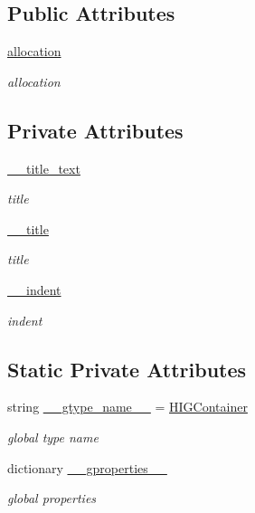 \subsection*{Public Attributes}
\begin{DoxyCompactItemize}
\item 
\hyperlink{classvisualizer_1_1higcontainer_1_1HIGContainer_af0d4a951cf5815dc69d44bea5d450c59}{allocation}
\begin{DoxyCompactList}\small\item\em allocation \end{DoxyCompactList}\end{DoxyCompactItemize}
\subsection*{Private Attributes}
\begin{DoxyCompactItemize}
\item 
\hyperlink{classvisualizer_1_1higcontainer_1_1HIGContainer_a12344394ae96c6b0ac7ce93924f299ef}{\+\_\+\+\_\+title\+\_\+text}
\begin{DoxyCompactList}\small\item\em title \end{DoxyCompactList}\item 
\hyperlink{classvisualizer_1_1higcontainer_1_1HIGContainer_a527e8de68287e427e80fd1559cc8fdc0}{\+\_\+\+\_\+title}
\begin{DoxyCompactList}\small\item\em title \end{DoxyCompactList}\item 
\hyperlink{classvisualizer_1_1higcontainer_1_1HIGContainer_a367321016d24d57339971c6892896b3c}{\+\_\+\+\_\+indent}
\begin{DoxyCompactList}\small\item\em indent \end{DoxyCompactList}\end{DoxyCompactItemize}
\subsection*{Static Private Attributes}
\begin{DoxyCompactItemize}
\item 
string \hyperlink{classvisualizer_1_1higcontainer_1_1HIGContainer_a9f05df0b48acf6809b31fe11165c6008}{\+\_\+\+\_\+gtype\+\_\+name\+\_\+\+\_\+} = \textquotesingle{}\hyperlink{classvisualizer_1_1higcontainer_1_1HIGContainer}{H\+I\+G\+Container}\textquotesingle{}
\begin{DoxyCompactList}\small\item\em global type name \end{DoxyCompactList}\item 
dictionary \hyperlink{classvisualizer_1_1higcontainer_1_1HIGContainer_a8e4a49730c2f9e8656954053de34b88a}{\+\_\+\+\_\+gproperties\+\_\+\+\_\+}
\begin{DoxyCompactList}\small\item\em global properties \end{DoxyCompactList}\end{DoxyCompactItemize}


